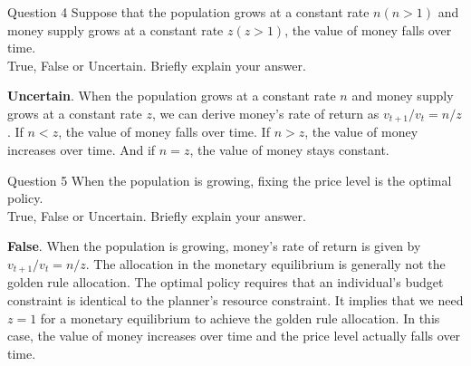 \documentclass[a4paper]{article}
\newif\IfInSansMode
\numberwithin{equation}{section}
\numberwithin{figure}{section}
\begin{document}
	\begin{questionbox}{Question 4}
		Suppose that the population grows at a constant rate \( n (n > 1) \) and money supply grows at a constant rate \( z (z > 1) \), the value of money falls over time.\\
		True, False or Uncertain. Briefly explain your answer.
		\begin{explanationbox}
			\textbf{Uncertain}. When the population grows at a constant rate \(n\) and money supply grows at a constant rate \(z\), we can derive money's rate of return as \(v_{t+1}/v_t = n/z\). If \(n < z\), the value of money falls over time. If \(n > z\), the value of money increases over time. And if \(n = z\), the value of money stays constant.
		\end{explanationbox}
	\end{questionbox}
	\begin{questionbox}{Question 5}
		When the population is growing, fixing the price level is the optimal policy.\\
		True, False or Uncertain. Briefly explain your answer.
		\begin{explanationbox}
			\textbf{False}. When the population is growing, money's rate of return is given by \(v_{t+1}/v_t = n/z\). The allocation in the monetary equilibrium is generally not the golden rule allocation. The optimal policy requires that an individual's budget constraint is identical to the planner's resource constraint. It implies that we need \(z=1\) for a monetary equilibrium to achieve the golden rule allocation. In this case, the value of money increases over time and the price level actually falls over time.
		\end{explanationbox}
	\end{questionbox}
\end{document}

